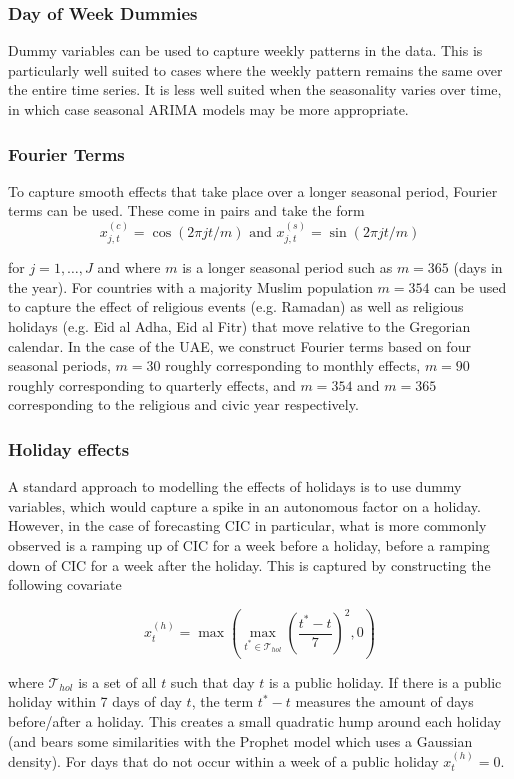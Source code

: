 \subsubsection{Day of Week Dummies}

Dummy variables can be used to capture weekly patterns in the data. This is particularly well suited to cases where the weekly pattern remains the same over the entire time series. It is less well suited when the seasonality varies over time, in which case seasonal ARIMA models may be more appropriate.

\subsubsection{Fourier Terms}

To capture smooth effects that take place over a longer seasonal period, Fourier terms can be used. These come in pairs and take the form
\[
x_{j,t}^{(c)}=\cos(2\pi jt/m)\textrm{  and  } x_{j,t}^{(s)}=\sin(2\pi jt/m)
\]

for $j=1,\dots,J$ and where $m$ is a longer seasonal period such as $m=365$ (days in the year). For countries with a majority Muslim population $m=354$ can be used to capture the effect of religious events (e.g. Ramadan) as well as religious holidays (e.g. Eid al Adha, Eid al Fitr) that move relative to the Gregorian calendar. In the case of the UAE, we construct Fourier terms based on four seasonal periods, $m=30$ roughly corresponding to monthly effects, $m=90$ roughly corresponding to quarterly effects, and $m=354$ and $m=365$ corresponding to the religious and civic year respectively.

\subsubsection{Holiday effects}

A standard approach to modelling the effects of holidays is to use dummy variables, which would capture a spike in an autonomous factor on a holiday. However, in the case of forecasting CIC in particular, what is more commonly observed is a ramping up of CIC for a week before a holiday, before a ramping down of CIC for a week after the holiday. This is captured by constructing the following covariate

\[
x_t^{(h)}=\max\left(\underset{t^*\in\mathcal{T}_{hol}}{\max}\left(\frac{t^*-t}{7}\right)^2,0\right)
\]

where $\mathcal{T}_{hol}$ is a set of all $t$ such that day $t$ is a public holiday. If there is a public holiday within 7 days of day $t$, the term $t^*-t$ measures the amount of days before/after a holiday. This creates a small quadratic hump around each holiday (and bears some similarities with the Prophet model \citep{TayLet2018} which uses a Gaussian density). For days that do not occur within a week of a public holiday $x_t^{(h)}=0$.

